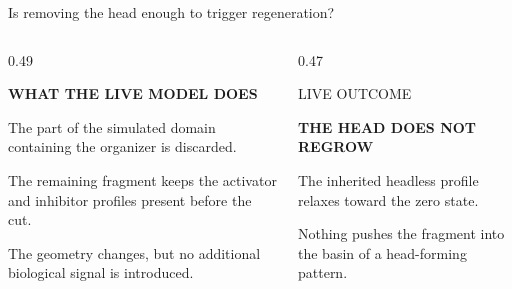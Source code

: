 \begin{frame}{Is removing the head enough to trigger regeneration?}

  \vspace{-0.16cm}

  \begin{columns}[c,onlytextwidth]
    \begin{column}{0.49\textwidth}
      {\color{HydraGold}\bfseries\fontsize{7.7}{9.2}\selectfont
        WHAT THE LIVE MODEL DOES\par}

      \vspace{0.16cm}

        {The part of the simulated domain containing the organizer is discarded.}

      \vspace{-0.12cm}

        {The remaining fragment keeps the activator and inhibitor profiles present before the cut.}

      \vspace{-0.12cm}

        {The geometry changes, but no additional biological signal is introduced.}
    \end{column}

    \begin{column}{0.47\textwidth}
      {\centering\color{HydraMuted}\fontsize{7.6}{9.2}\selectfont
        LIVE OUTCOME\par}

      \vspace{0.26cm}

      {\centering\color{HydraWhite}\bfseries\fontsize{13.2}{16}\selectfont
        THE HEAD DOES NOT REGROW
      \par}

      \vspace{0.34cm}

        {The inherited headless profile relaxes toward the zero state.}

      \vspace{-0.12cm}

        {Nothing pushes the fragment into the basin of a head-forming pattern.}
    \end{column}
  \end{columns}

  \vspace{0.06cm}

\end{frame}


